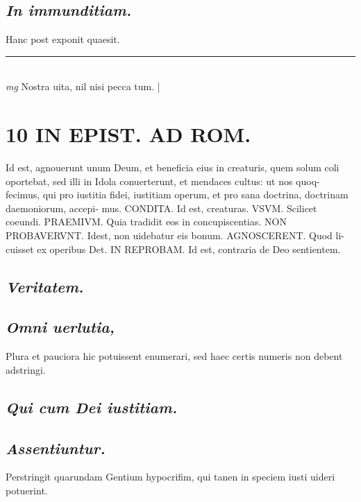 \documentclass{article}
\begin{document}
\begin{pages}
\subsection*{\textit{In immunditiam. }}\pstart Hanc post exponit quaesit.   \pend
\vspace{0.5cm}\noindent
\vspace{0.2cm}\rule{1cm}{0.2pt}\\ 
\hspace{0.2cm}\textit{mg}
\footnotesize Nostra uita, nil nisi pecca tum. 
\normalsize| 
\section*{10 IN EPIST. AD ROM.  }
\marginpar{[ p.]}
\marginpar{[ p.]}\pstart Id est, agnouerunt unum Deum, et beneficia eius in creaturis, quem solum coli oportebat, sed illi in Idola conuerterunt, et mendaces cultus: ut nos quoq- fecimus, qui pro iustitia fidei, iustitiam operum, et pro sana doctrina, doctrinam daemoniorum, accepi- mus. CONDITA. Id est, creaturas. VSVM. Scilicet coeundi. PRAEMIVM. Quia tradidit eos in concupiscentias. NON PROBAVERVNT. Idest, non uidebatur eis bonum. AGNOSCERENT. Quod li- cuisset ex operibus Det. IN REPROBAM.  Id est, contraria de Deo sentientem.   \pend
{}
{}
\subsection*{\textit{Veritatem. }}
{}
\subsection*{\textit{Omni uerlutia, }}\pstart Plura et pauciora hic potuissent enumerari, sed haec certis numeris non debent adstringi.  \pend
{}
{}
\subsection*{\textit{Qui cum Dei iustitiam. }}
{}
\subsection*{\textit{Assentiuntur. }}\pstart Perstringit quarundam Gentium hypocrifim, qui tanen in speciem iusti uideri potuerint.   \pend
{}
{}

\end{pages}
\end{document}
